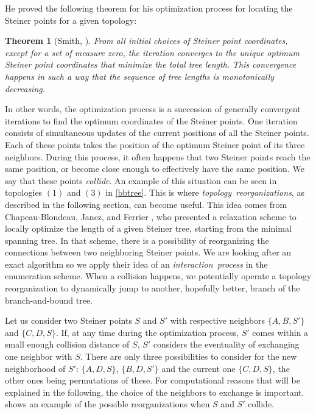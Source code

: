 \documentclass{article}
\theoremstyle{plain}
\newtheorem{theorem}{Theorem}[section]
\begin{document}
He proved the following theorem for his optimization process for locating the Steiner points for a given topology: 
\begin{theorem}[Smith, \cite{Smith}]
\label{thmSmith}
From all initial choices of Steiner point coordinates, except for a set of measure zero, the iteration converges to the unique optimum Steiner point coordinates that minimize the total tree length. This convergence happens in such a way that the sequence of tree lengths is monotonically decreasing.
\end{theorem}

In other words, the optimization process is a succession of generally convergent iterations to find the optimum coordinates of the Steiner points. One iteration consists of simultaneous updates of the current positions of all the Steiner points. Each of these points takes the position of the optimum Steiner point of its three neighbors. During this process, it often happens that two Steiner points reach the same position, or become close enough to effectively have the same position. 
We say that these points \emph{collide}. 
An example of this situation can be seen in topologies $(1)$ and $(3)$ in \cref{bbtree}. 
This is where \mbox{\emph{topology reorganizations}}, as described in the following section, can become useful. 
This idea comes from Chapeau-Blondeau, Janez, and Ferrier \cite{ref3}, who presented a relaxation scheme to locally optimize the length of a given Steiner tree, starting from the minimal spanning tree. 
In that scheme, there is a possibility of reorganizing the connections between two neighboring Steiner points. 
We are looking after an exact algorithm so we apply their idea of an \mbox{\emph{interaction process}} in the enumeration scheme. 
When a collision happens, we potentially operate a topology reorganization to dynamically jump to another, hopefully better, branch of the branch-and-bound tree.


Let us consider two Steiner points $S$ and $S'$ with respective neighbors $\{A,B,S'\}$ and $\{C,D,S\}$. 
If, at any time during the optimization process, $S'$ comes within a small enough collision distance of $S$, $S'$ considers the eventuality of exchanging one neighbor with $S$. 
There are only three possibilities to consider for the new neighborhood of $S'$: $\{A,D,S\}$, $\{B,D,S'\}$ and the current one $\{C,D,S\}$, the other ones being permutations of these. 
For computational reasons that will be explained in the following, the choice of the neighbors to exchange is important. 
 shows an example of the possible reorganizations when $S$ and $S'$ collide. 
\end{document}
